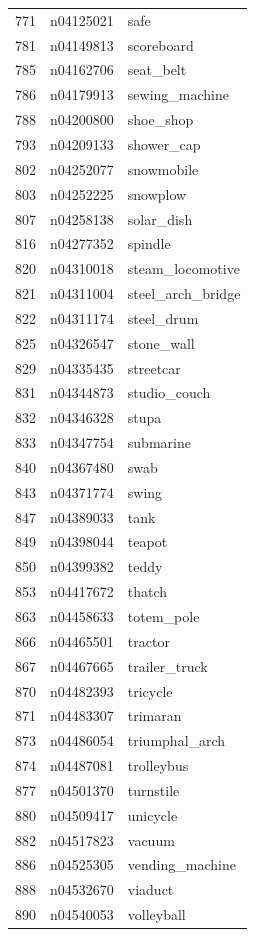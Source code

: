 \begin{table}
\begin{tabular}{cll}
771 & n04125021 & safe \\
781 & n04149813 & scoreboard \\
785 & n04162706 & seat_belt \\
786 & n04179913 & sewing_machine \\
788 & n04200800 & shoe_shop \\
793 & n04209133 & shower_cap \\
802 & n04252077 & snowmobile \\
803 & n04252225 & snowplow \\
807 & n04258138 & solar_dish \\
816 & n04277352 & spindle \\
820 & n04310018 & steam_locomotive \\
821 & n04311004 & steel_arch_bridge \\
822 & n04311174 & steel_drum \\
825 & n04326547 & stone_wall \\
829 & n04335435 & streetcar \\
831 & n04344873 & studio_couch \\
832 & n04346328 & stupa \\
833 & n04347754 & submarine \\
840 & n04367480 & swab \\
843 & n04371774 & swing \\
847 & n04389033 & tank \\
849 & n04398044 & teapot \\
850 & n04399382 & teddy \\
853 & n04417672 & thatch \\
863 & n04458633 & totem_pole \\
866 & n04465501 & tractor \\
867 & n04467665 & trailer_truck \\
870 & n04482393 & tricycle \\
871 & n04483307 & trimaran \\
873 & n04486054 & triumphal_arch \\
874 & n04487081 & trolleybus \\
877 & n04501370 & turnstile \\
880 & n04509417 & unicycle \\
882 & n04517823 & vacuum \\
886 & n04525305 & vending_machine \\
888 & n04532670 & viaduct \\
890 & n04540053 & volleyball \\

\end{tabular}
\end{table}
